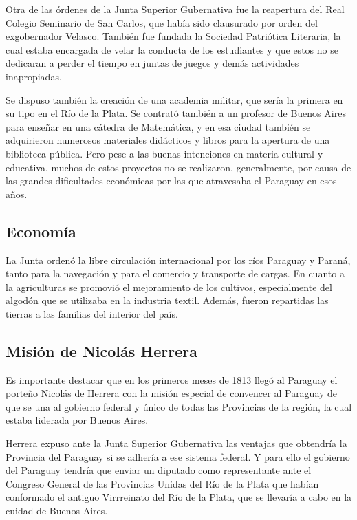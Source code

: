 \documentclass{article}
\begin{document}
Otra de las órdenes de la Junta Superior Gubernativa fue la reapertura del
Real Colegio Seminario de San Carlos, que había sido clausurado por orden
del exgobernador Velasco. También fue fundada la Sociedad Patriótica
Literaria, la cual estaba encargada de velar la conducta de los estudiantes
y que estos no se dedicaran a perder el tiempo en juntas de juegos y demás
actividades inapropiadas.

Se dispuso también la creación de una academia militar, que sería la primera
en su tipo en el Río de la Plata. Se contrató también a un profesor de 
Buenos Aires para enseñar en una cátedra de Matemática, y en esa ciudad 
también se adquirieron numerosos materiales didácticos y libros para la
apertura de una biblioteca pública. Pero pese a las buenas intenciones en
materia cultural y educativa, muchos de estos proyectos no se realizaron, 
generalmente, por causa de las grandes dificultades económicas por las que
atravesaba el Paraguay en esos años.

  \subsection*{Economía}
  La Junta ordenó la libre circulación internacional por los ríos Paraguay
y Paraná, tanto para la navegación y para el comercio y transporte de cargas.
En cuanto a la agriculturas se promovió el mejoramiento de los cultivos,
especialmente del algodón que se utilizaba en la industria textil. Además,
fueron repartidas las tierras a las familias del interior del país.

  \subsection*{Misión de Nicolás Herrera}
  Es importante destacar que en los primeros meses de 1813 llegó al Paraguay 
el porteño Nicolás de Herrera con la misión especial de convencer al Paraguay
de que se una al gobierno federal y único de todas las Provincias de la
región, la cual estaba liderada por Buenos Aires.

Herrera expuso ante la Junta Superior Gubernativa las ventajas que obtendría 
la Provincia del Paraguay si se adhería a ese sistema federal. Y para ello
el gobierno del Paraguay tendría que enviar un diputado como representante 
ante el Congreso General de las Provincias Unidas del Río de la Plata que 
habían conformado el antiguo Virrreinato del Río de la Plata, que se 
llevaría a cabo en la cuidad de Buenos Aires.
\end{document}
